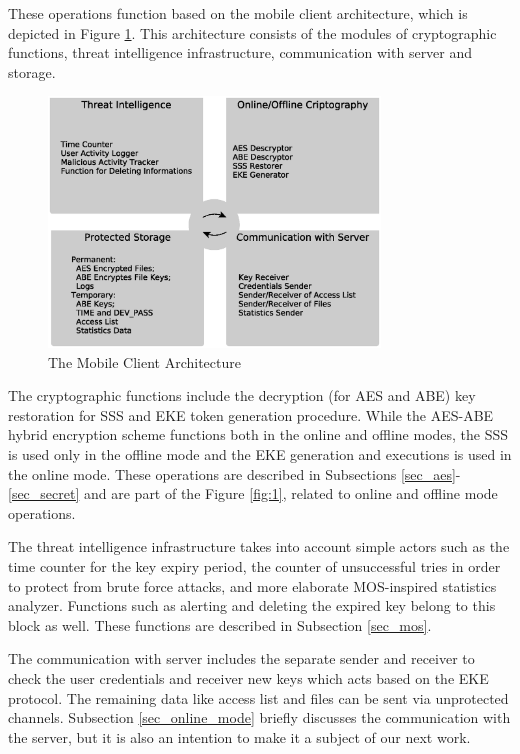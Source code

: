 \documentclass[twocolumn]{svjour3}          	%
\begin{document}
These operations function based on the mobile client architecture, which is depicted in Figure \ref{fig:2}. This architecture consists of the modules of cryptographic functions, threat intelligence infrastructure, communication with server and storage.

\begin{figure}[h!]
	\centering
	\includegraphics[width=8.8cm]{figures/mobileclientarchitecture.eps}
	\caption{The Mobile Client Architecture}
	\label{fig:2}
\end{figure}

The cryptographic functions include the decryption (for AES and ABE) key restoration for SSS and EKE token generation procedure. While the AES-ABE hybrid encryption scheme functions both in the online and offline modes, the SSS is used only in the offline mode and the EKE generation and executions is used in the online mode. These operations are described in Subsections \ref{sec_aes}-\ref{sec_secret} and are part of the Figure \ref{fig:1}, related to online and offline mode operations.

The threat intelligence infrastructure takes into account simple actors such as the time counter for the key expiry period, the counter of unsuccessful tries in order to protect from brute force attacks, and more elaborate MOS-inspired statistics analyzer. Functions such as alerting and deleting the expired key belong to this block as well. These functions are described in Subsection \ref{sec_mos}.

The communication with server includes the separate sender and receiver to check the user credentials and receiver new keys which acts based on the EKE protocol. The remaining data like access list and files can be sent via unprotected channels. Subsection \ref{sec_online_mode} briefly discusses the communication with the server, but it is also an intention to make it a subject of our next work.
\end{document}
